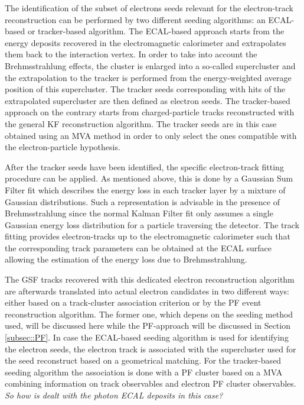 The identification of the subset of electrons seeds relevant for the electron-track reconstruction can be performed by two different seeding algorithms: an ECAL-based or tracker-based algorithm.
The ECAL-based approach starts from the energy deposits recovered in the electromagnetic calorimeter and extrapolates them back to the interaction vertex. In order to take into account the Brehmsstrahlung effects, the cluster is enlarged into a so-called supercluster and the extrapolation to the tracker is performed from the energy-weighted average position of this supercluster. The tracker seeds corresponding with hits of the extrapolated supercluster are then defined as electron seeds. The tracker-based approach on the contrary starts from charged-particle tracks reconstructed with the general KF reconstruction algorithm. The tracker seeds are in this case obtained using an MVA method in order to only select the ones compatible with the electron-particle hypothesis.

After the tracker seeds have been identified, the specific electron-track fitting procedure can be applied. As mentioned above, this is done by a Gaussian Sum Filter fit which describes the energy loss in each tracker layer by a mixture of Gaussian distributions. Such a representation is advisable in the presence of Brehmsstrahlung since the normal Kalman Filter fit only assumes a single Gaussian energy loss distribution for a particle traversing the detector. The track fitting provides electron-tracks up to the electromagnetic calorimeter such that the corresponding track parameters can be obtained at the ECAL surface allowing the estimation of the energy loss due to Brehmsstrahlung.

The GSF tracks recovered with this dedicated electron reconstruction algorithm are afterwards translated into actual electron candidates in two different ways: either based on a track-cluster association criterion or by the PF event reconstruction algorithm. The former one, which depens on the seeding method used, will be discussed here while the PF-approach will be discussed in Section \ref{subsec::PF}.
In case the ECAL-based seeding algorithm is used for identifying the electron seeds, the electron track is associated with the supercluster used for the seed reconstruct based on a geometrical matching. For the tracker-based seeding algorithm the association is done with a PF cluster based on a MVA combining information on track observables and electron PF cluster observables. \textit{So how is dealt with the photon ECAL deposits in this case?} 

